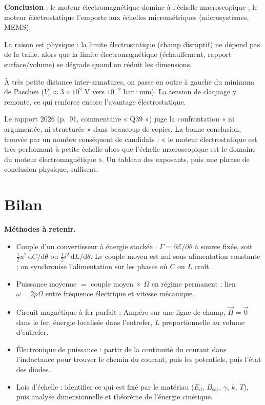 \documentclass[11pt,a4paper]{article}
\providecommand{\tightlist}{\setlength{\itemsep}{0pt}\setlength{\parskip}{0pt}}
\begin{document}
\textbf{Conclusion} : le moteur électromagnétique domine à l'échelle macroscopique ; le moteur électrostatique l'emporte aux échelles micrométriques (microsystèmes, MEMS).

La raison est physique : la limite électrostatique (champ disruptif) ne dépend pas de la taille, alors que la limite électromagnétique (échauffement, rapport surface/volume) se dégrade quand on réduit les dimensions.

À très petite distance inter-armatures, on passe en outre à gauche du minimum de Paschen (\(V_c\approx3\times10^{2}\) V vers \(10^{-2}\) bar·mm). La tension de claquage y remonte, ce qui renforce encore l'avantage électrostatique.

\begin{jury}

Le rapport 2026 (p.~91, commentaire « Q39 ») juge la confrontation « ni argumentée, ni structurée » dans beaucoup de copies. La bonne conclusion, trouvée par un nombre conséquent de candidats : « le moteur électrostatique est très performant à petite échelle alors que l'échelle macroscopique est le domaine du moteur électromagnétique ». Un tableau des exposants, puis une phrase de conclusion physique, suffisent.

\end{jury}

\hypertarget{bilan}{%
\section{Bilan}\label{bilan}}

\textbf{Méthodes à retenir.}

\begin{itemize}
\tightlist
\item
  Couple d'un convertisseur à énergie stockée : \(\Gamma=\partial\mathcal E/\partial\theta\) à source fixée, soit \(\tfrac12u^2\,\mathrm dC/\mathrm d\theta\) ou \(\tfrac12i^2\,\mathrm dL/\mathrm d\theta\). Le couple moyen est nul sous alimentation constante ; on synchronise l'alimentation sur les phases où \(C\) ou \(L\) croît.
\item
  Puissance moyenne \(=\) couple moyen × \(\Omega\) en régime permanent ; lien \(\omega=2p\Omega\) entre fréquence électrique et vitesse mécanique.
\item
  Circuit magnétique à fer parfait : Ampère sur une ligne de champ, \(\vec H=\vec 0\) dans le fer, énergie localisée dans l'entrefer, \(L\) proportionnelle au volume d'entrefer.
\item
  Électronique de puissance : partir de la continuité du courant dans l'inductance pour trouver le chemin du courant, puis les potentiels, puis l'état des diodes.
\item
  Lois d'échelle : identifier ce qui est fixé par le matériau (\(E_d\), \(B_{\text{sat}}\), \(\gamma\), \(k\), \(T\)), puis analyse dimensionnelle et théorème de l'énergie cinétique.
\end{itemize}
\end{document}

